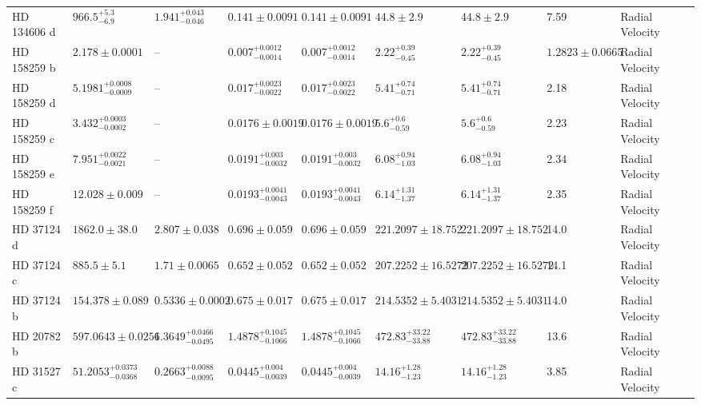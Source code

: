 \begin{tabular}{llllllllll}
HD 134606 d & $966.5^{+5.3}_{-6.9}$ & $1.941^{+0.043}_{-0.046}$ & $0.141 \pm 0.0091$ & $0.141 \pm 0.0091$ & $44.8 \pm 2.9$ & $44.8 \pm 2.9$ & 7.59 & Radial Velocity & \cite{LI_ET_AL_2024} \\
HD 158259 b & $2.178 \pm 0.0001$ & -- & $0.007^{+0.0012}_{-0.0014}$ & $0.007^{+0.0012}_{-0.0014}$ & $2.22^{+0.39}_{-0.45}$ & $2.22^{+0.39}_{-0.45}$ & $1.2823 \pm 0.0665$ & Radial Velocity & \cite{HARA_ET_AL__2020} \\
HD 158259 d & $5.1981^{+0.0008}_{-0.0009}$ & -- & $0.017^{+0.0023}_{-0.0022}$ & $0.017^{+0.0023}_{-0.0022}$ & $5.41^{+0.74}_{-0.71}$ & $5.41^{+0.74}_{-0.71}$ & 2.18 & Radial Velocity & \cite{HARA_ET_AL__2020} \\
HD 158259 c & $3.432^{+0.0003}_{-0.0002}$ & -- & $0.0176 \pm 0.0019$ & $0.0176 \pm 0.0019$ & $5.6^{+0.6}_{-0.59}$ & $5.6^{+0.6}_{-0.59}$ & 2.23 & Radial Velocity & \cite{HARA_ET_AL__2020} \\
HD 158259 e & $7.951^{+0.0022}_{-0.0021}$ & -- & $0.0191^{+0.003}_{-0.0032}$ & $0.0191^{+0.003}_{-0.0032}$ & $6.08^{+0.94}_{-1.03}$ & $6.08^{+0.94}_{-1.03}$ & 2.34 & Radial Velocity & \cite{HARA_ET_AL__2020} \\
HD 158259 f & $12.028 \pm 0.009$ & -- & $0.0193^{+0.0041}_{-0.0043}$ & $0.0193^{+0.0041}_{-0.0043}$ & $6.14^{+1.31}_{-1.37}$ & $6.14^{+1.31}_{-1.37}$ & 2.35 & Radial Velocity & \cite{HARA_ET_AL__2020} \\
HD 37124 d & $1862.0 \pm 38.0$ & $2.807 \pm 0.038$ & $0.696 \pm 0.059$ & $0.696 \pm 0.059$ & $221.2097 \pm 18.752$ & $221.2097 \pm 18.752$ & 14.0 & Radial Velocity & \cite{WRIGHT_ET_AL__2011} \\
HD 37124 c & $885.5 \pm 5.1$ & $1.71 \pm 0.0065$ & $0.652 \pm 0.052$ & $0.652 \pm 0.052$ & $207.2252 \pm 16.5272$ & $207.2252 \pm 16.5272$ & 14.1 & Radial Velocity & \cite{WRIGHT_ET_AL__2011} \\
HD 37124 b & $154.378 \pm 0.089$ & $0.5336 \pm 0.0002$ & $0.675 \pm 0.017$ & $0.675 \pm 0.017$ & $214.5352 \pm 5.4031$ & $214.5352 \pm 5.4031$ & 14.0 & Radial Velocity & \cite{WRIGHT_ET_AL__2011} \\
HD 20782 b & $597.0643 \pm 0.0256$ & $1.3649^{+0.0466}_{-0.0495}$ & $1.4878^{+0.1045}_{-0.1066}$ & $1.4878^{+0.1045}_{-0.1066}$ & $472.83^{+33.22}_{-33.88}$ & $472.83^{+33.22}_{-33.88}$ & 13.6 & Radial Velocity & \cite{UDRY_ET_AL__2019} \\
HD 31527 c & $51.2053^{+0.0373}_{-0.0368}$ & $0.2663^{+0.0088}_{-0.0095}$ & $0.0445^{+0.004}_{-0.0039}$ & $0.0445^{+0.004}_{-0.0039}$ & $14.16^{+1.28}_{-1.23}$ & $14.16^{+1.28}_{-1.23}$ & 3.85 & Radial Velocity & \cite{UDRY_ET_AL__2019} \\

\end{tabular}
